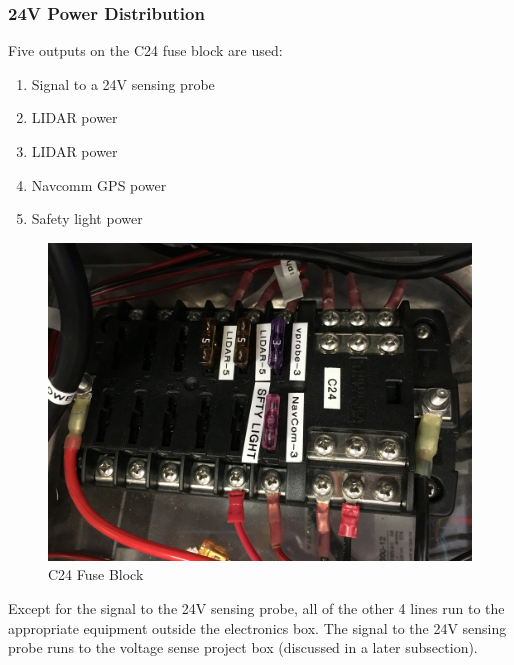 \subsubsection{24V Power Distribution}

\begin{minipage}{0.6\textwidth}
Five outputs on the C24 fuse block are used:\\
\begin{enumerate}
\item Signal to a 24V sensing probe
\item LIDAR power
\item LIDAR power
\item Navcomm GPS power
\item Safety light power
\end{enumerate}
\end{minipage} \hfill
\begin{minipage}{0.5\textwidth}
\begin{figure}[H]
\centering
\includegraphics[scale=.05, angle=-90]{Photos/C24.jpg}
\caption{\label{fig:C24} C24 Fuse Block}
\end{figure}
\end{minipage}

\bigskip

\noindent  Except for the signal to the 24V sensing probe, all of the other 4 lines run to the appropriate equipment outside the electronics box. The signal to the 24V sensing probe runs to the voltage sense project box (discussed in a later subsection).

\newpage

